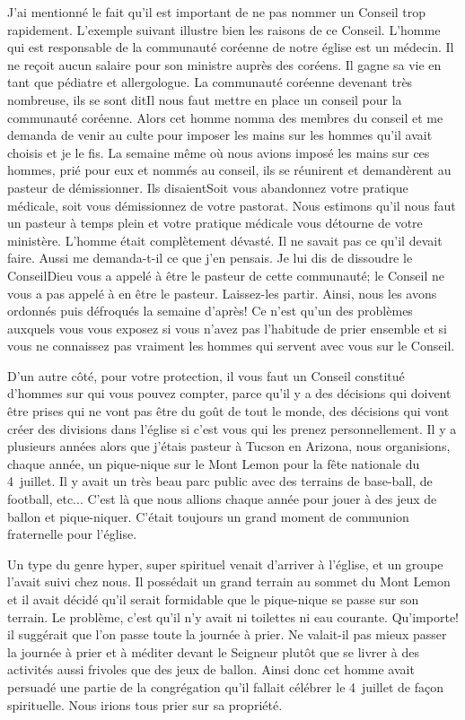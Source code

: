 J’ai mentionné le fait qu’il est important de ne pas nommer un Conseil trop rapidement. L’exemple suivant illustre bien
les raisons de ce Conseil. L’homme qui est responsable de la communauté coréenne de notre église est un médecin. Il
ne reçoit aucun salaire pour son ministre auprès des coréens. Il gagne sa vie en tant que pédiatre et allergologue. La
communauté coréenne devenant très nombreuse, ils se sont dit\frcolon\og Il nous faut mettre en place un conseil pour la
communauté coréenne. \fg{} Alors cet homme nomma des membres du conseil et me demanda de venir au culte pour
imposer les mains sur les hommes qu’il avait choisis et je le fis. La semaine même où nous avions imposé les mains
sur ces hommes, prié pour eux et nommés au conseil, ils se réunirent et demandèrent au pasteur de démissionner. Ils
disaient\frcolon\og Soit vous abandonnez votre pratique médicale, soit vous démissionnez de votre pastorat. Nous estimons
qu’il nous faut un pasteur à temps plein et votre pratique médicale vous détourne de votre ministère.\fg{} L’homme était
complètement dévasté. Il ne savait pas ce qu’il devait faire. Aussi me demanda-t-il ce que j’en pensais. Je lui dis de
dissoudre le Conseil\frcolon\og Dieu vous a appelé à être le pasteur de cette communauté; le Conseil ne vous a pas appelé à
en être le pasteur. Laissez-les partir.\fg{} Ainsi, nous les avons ordonnés puis défroqués la semaine d'après! Ce n’est
qu’un des problèmes auxquels vous vous exposez si vous n’avez pas l’habitude de prier ensemble et si vous ne
connaissez pas vraiment les hommes qui servent avec vous sur le Conseil.

D’un autre côté, pour votre protection, il vous faut un Conseil constitué d’hommes sur qui vous pouvez compter, parce
qu’il y a des décisions qui doivent être prises qui ne vont pas être du goût de tout le monde, des décisions qui vont
créer des divisions dans l’église si c'est vous qui les prenez personnellement. Il y a plusieurs années alors que j’étais
pasteur à Tucson en Arizona, nous organisions, chaque année, un pique-nique sur le Mont Lemon pour la fête
nationale du 4~juillet. Il y avait un très beau parc public avec des terrains de base-ball, de football, etc... C’est là que
nous allions chaque année pour jouer à des jeux de ballon et pique-niquer. C'était toujours un grand moment de
communion fraternelle pour l'église.

Un type du genre \og hyper, super spirituel\fg{} venait d'arriver à l'église, et un groupe l’avait suivi chez nous. Il possédait
un grand terrain au sommet du Mont Lemon et il avait décidé qu'il serait formidable que le pique-nique se passe sur
son terrain. Le problème, c'est qu'il n’y avait ni toilettes ni eau courante. Qu'importe! il suggérait que l’on passe toute
la journée à prier. Ne valait-il pas mieux passer la journée à prier et à méditer devant le Seigneur plutôt
que se livrer à des activités aussi frivoles que des jeux de ballon. Ainsi donc cet homme avait persuadé une partie de
la congrégation qu'il fallait célébrer le 4~juillet de façon spirituelle. Nous irions tous prier sur sa propriété.

